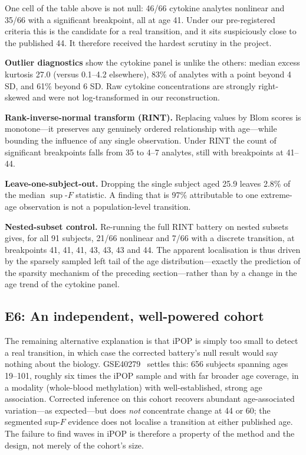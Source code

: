 \documentclass{article}
\begin{document}
One cell of the table above is not null: 46/66 cytokine analytes nonlinear and 35/66 with a significant breakpoint, all at age 41. Under our pre-registered criteria this is the candidate for a real transition, and it sits suspiciously close to the published 44. It therefore received the hardest scrutiny in the project.

\textbf{Outlier diagnostics} show the cytokine panel is unlike the others: median excess kurtosis 27.0 (versus 0.1--4.2 elsewhere), 83\% of analytes with a point beyond 4 SD, and 61\% beyond 6 SD. Raw cytokine concentrations are strongly right-skewed and were not log-transformed in our reconstruction.

\textbf{Rank-inverse-normal transform (RINT).} Replacing values by Blom scores is monotone---it preserves any genuinely ordered relationship with age---while bounding the influence of any single observation. Under RINT the count of significant breakpoints falls from 35 to 4--7 analytes, still with breakpoints at 41--44.

\textbf{Leave-one-subject-out.} Dropping the single subject aged 25.9 leaves 2.8\% of the median $\sup$-$F$ statistic. A finding that is 97\% attributable to one extreme-age observation is not a population-level transition.

\textbf{Nested-subset control.} Re-running the full RINT battery on nested subsets gives, for all 91 subjects, 21/66 nonlinear and 7/66 with a discrete transition, at breakpoints 41, 41, 41, 43, 43, 43 and 44. The apparent localisation is thus driven by the sparsely sampled left tail of the age distribution---exactly the prediction of the sparsity mechanism of the preceding section---rather than by a change in the age trend of the cytokine panel.

\subsection{E6: An independent, well-powered cohort}

The remaining alternative explanation is that iPOP is simply too small to detect a real transition, in which case the corrected battery's null result would say nothing about the biology. GSE40279~\cite{hannum2013} settles this: 656 subjects spanning ages 19--101, roughly six times the iPOP sample and with far broader age coverage, in a modality (whole-blood methylation) with well-established, strong age association. Corrected inference on this cohort recovers abundant age-associated variation---as expected---but does \emph{not} concentrate change at 44 or 60; the segmented sup-$F$ evidence does not localise a transition at either published age. The failure to find waves in iPOP is therefore a property of the method and the design, not merely of the cohort's size.
\end{document}

